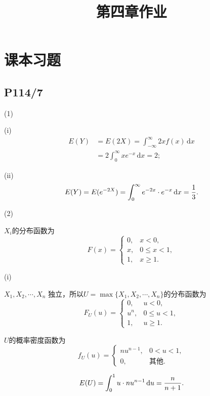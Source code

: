 \documentclass[UTF8,a4paper,10pt]{ctexart}
\title{第四章作业}
\begin{document}
\section{课本习题}

\subsection{P114/7}
\noindent(1)

(i)
\begin{align}
    E(Y) &= E(2X) = \int_{-\infty}^\infty 2xf(x)\,\text{d}x \nonumber \\
         &= 2 \int_0^\infty x e^{-x}\,\text{d}x = 2;
\end{align}

(ii)
\begin{equation}
    E(Y) = E(e^{-2X}) = \int_0^\infty e^{-2x}\cdot e^{-x}\,\text{d}x = {1\over3}.\\
\end{equation}

\noindent(2)

$X_i$的分布函数为
\begin{equation}
    F(x)= \left\{
    \begin{array}{lr}
    0,& x<0, \\
    x, & 0\leq x<1, \\
    1, & x\geq1 . 
    \end{array}
    \right.
\end{equation}

(i)

$X_1, X_2, \cdots, X_n$ 独立，所以$U=\max\{X_1,X_2,\cdots,X_n\}$的分布函数为
\begin{equation}
    F_U(u)= \left\{
    \begin{array}{lr}
    0,& u<0, \\
    u^n, & 0\leq u<1, \\
    1, & u\geq1 . 
    \end{array}
    \right.
\end{equation}

$U$的概率密度函数为
\begin{equation}
    f_U(u)= \left\{
    \begin{array}{lr}
        nu^{n-1}, & 0<u<1, \\
        0, & \text{其他}.
    \end{array}
    \right.
\end{equation}

\begin{equation}
    E(U) = \int_0^1 u \cdot nu^{n-1}\,\text{d}u = {n\over n+1}.
\end{equation}
\end{document}

